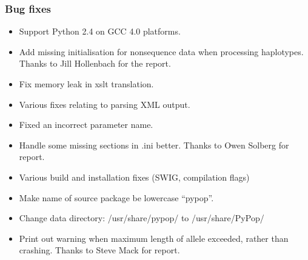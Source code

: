 \documentclass[letterpaper,10pt,english,openany,oneside]{sphinxmanual}
\begin{document}
\subsubsection{Bug fixes}
\label{\detokenize{docs/guide-chapter-changes:bug-fixes}}\begin{itemize}
\item {} 
\sphinxAtStartPar
Support Python 2.4 on GCC 4.0 platforms.

\item {} 
\sphinxAtStartPar
Add missing initialisation for non\sphinxhyphen{}sequence data when processing
haplotypes.  Thanks to Jill Hollenbach for the report.

\item {} 
\sphinxAtStartPar
Fix memory leak in xslt translation.

\item {} 
\sphinxAtStartPar
Various fixes relating to parsing XML output.

\item {} 
\sphinxAtStartPar
Fixed an incorrect parameter name.

\item {} 
\sphinxAtStartPar
Handle some missing sections in .ini better. Thanks to
Owen Solberg for report.

\item {} 
\sphinxAtStartPar
Various build and installation fixes (SWIG, compilation flags)

\item {} 
\sphinxAtStartPar
Make name of source package be lowercase “pypop”.

\item {} 
\sphinxAtStartPar
Change data directory: /usr/share/pypop/ to /usr/share/PyPop/

\item {} 
\sphinxAtStartPar
Print out warning when maximum length of allele exceeded, rather than
crashing.  Thanks to Steve Mack for report.

\end{itemize}
\end{document}
